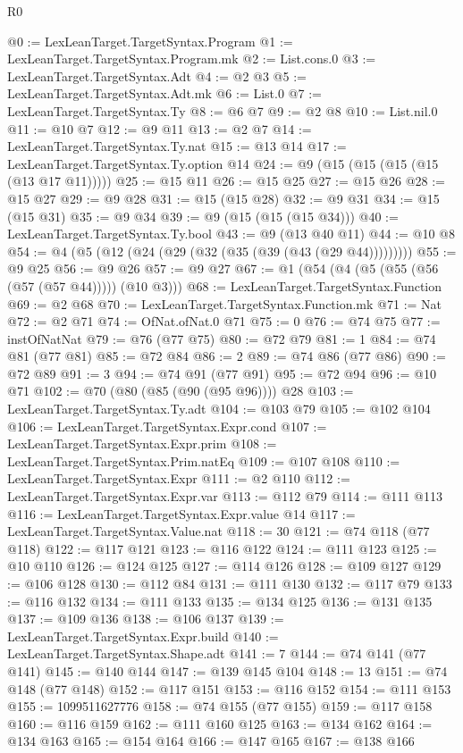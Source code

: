 \begin{lexlean}{R0}
\begin{coremodule}
@0 := LexLeanTarget.TargetSyntax.Program
@1 := LexLeanTarget.TargetSyntax.Program.mk
@2 := List.cons.{0}
@3 := LexLeanTarget.TargetSyntax.Adt
@4 := @2 @3
@5 := LexLeanTarget.TargetSyntax.Adt.mk
@6 := List.{0}
@7 := LexLeanTarget.TargetSyntax.Ty
@8 := @6 @7
@9 := @2 @8
@10 := List.nil.{0}
@11 := @10 @7
@12 := @9 @11
@13 := @2 @7
@14 := LexLeanTarget.TargetSyntax.Ty.nat
@15 := @13 @14
@17 := LexLeanTarget.TargetSyntax.Ty.option @14
@24 := @9 (@15 (@15 (@15 (@15 (@13 @17 @11)))))
@25 := @15 @11
@26 := @15 @25
@27 := @15 @26
@28 := @15 @27
@29 := @9 @28
@31 := @15 (@15 @28)
@32 := @9 @31
@34 := @15 (@15 @31)
@35 := @9 @34
@39 := @9 (@15 (@15 (@15 @34)))
@40 := LexLeanTarget.TargetSyntax.Ty.bool
@43 := @9 (@13 @40 @11)
@44 := @10 @8
@54 := @4 (@5 (@12 (@24 (@29 (@32 (@35 (@39 (@43 (@29 @44)))))))))
@55 := @9 @25
@56 := @9 @26
@57 := @9 @27
@67 := @1 (@54 (@4 (@5 (@55 (@56 (@57 (@57 @44))))) (@10 @3)))
@68 := LexLeanTarget.TargetSyntax.Function
@69 := @2 @68
@70 := LexLeanTarget.TargetSyntax.Function.mk
@71 := Nat
@72 := @2 @71
@74 := OfNat.ofNat.{0} @71
@75 := 0
@76 := @74 @75
@77 := instOfNatNat
@79 := @76 (@77 @75)
@80 := @72 @79
@81 := 1
@84 := @74 @81 (@77 @81)
@85 := @72 @84
@86 := 2
@89 := @74 @86 (@77 @86)
@90 := @72 @89
@91 := 3
@94 := @74 @91 (@77 @91)
@95 := @72 @94
@96 := @10 @71
@102 := @70 (@80 (@85 (@90 (@95 @96)))) @28
@103 := LexLeanTarget.TargetSyntax.Ty.adt
@104 := @103 @79
@105 := @102 @104
@106 := LexLeanTarget.TargetSyntax.Expr.cond
@107 := LexLeanTarget.TargetSyntax.Expr.prim
@108 := LexLeanTarget.TargetSyntax.Prim.natEq
@109 := @107 @108
@110 := LexLeanTarget.TargetSyntax.Expr
@111 := @2 @110
@112 := LexLeanTarget.TargetSyntax.Expr.var
@113 := @112 @79
@114 := @111 @113
@116 := LexLeanTarget.TargetSyntax.Expr.value @14
@117 := LexLeanTarget.TargetSyntax.Value.nat
@118 := 30
@121 := @74 @118 (@77 @118)
@122 := @117 @121
@123 := @116 @122
@124 := @111 @123
@125 := @10 @110
@126 := @124 @125
@127 := @114 @126
@128 := @109 @127
@129 := @106 @128
@130 := @112 @84
@131 := @111 @130
@132 := @117 @79
@133 := @116 @132
@134 := @111 @133
@135 := @134 @125
@136 := @131 @135
@137 := @109 @136
@138 := @106 @137
@139 := LexLeanTarget.TargetSyntax.Expr.build
@140 := LexLeanTarget.TargetSyntax.Shape.adt
@141 := 7
@144 := @74 @141 (@77 @141)
@145 := @140 @144
@147 := @139 @145 @104
@148 := 13
@151 := @74 @148 (@77 @148)
@152 := @117 @151
@153 := @116 @152
@154 := @111 @153
@155 := 1099511627776
@158 := @74 @155 (@77 @155)
@159 := @117 @158
@160 := @116 @159
@162 := @111 @160 @125
@163 := @134 @162
@164 := @134 @163
@165 := @154 @164
@166 := @147 @165
@167 := @138 @166

\end{coremodule}
\end{lexlean}
